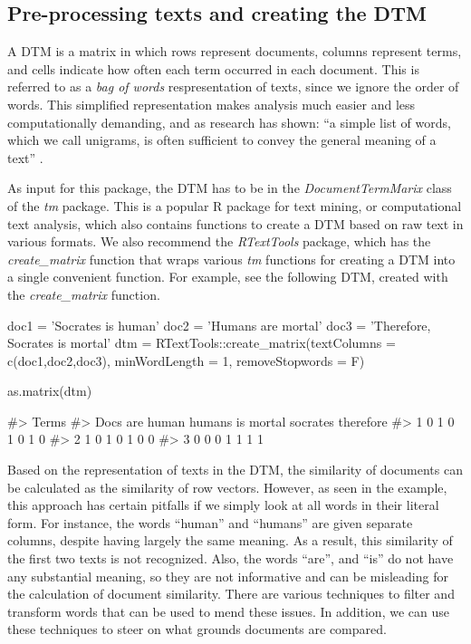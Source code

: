 \subsection{Pre-processing texts and creating the DTM}

A DTM is a matrix in which rows represent documents, columns represent
terms, and cells indicate how often each term occurred in each document.
This is referred to as a \emph{bag of words} respresentation of texts,
since we ignore the order of words. This simplified representation makes
analysis much easier and less computationally demanding, and as research
has shown: ``a simple list of words, which we call unigrams, is often
sufficient to convey the general meaning of a text''
\citep[6]{grimmer13}.

As input for this package, the DTM has to be in the
\emph{DocumentTermMarix} class of the \emph{tm} package. This is a
popular R package for text mining, or computational text analysis, which
also contains functions to create a DTM based on raw text in various
formats. We also recommend the \emph{RTextTools} package, which has the
\emph{create\_matrix} function that wraps various \emph{tm} functions
for creating a DTM into a single convenient function. For example, see
the following DTM, created with the \emph{create\_matrix} function.

\begin{Schunk}
\begin{Sinput}
doc1 = 'Socrates is human'
doc2 = 'Humans are mortal'
doc3 = 'Therefore, Socrates is mortal'
dtm = RTextTools::create_matrix(textColumns = c(doc1,doc2,doc3), 
                                minWordLength = 1, removeStopwords = F)

as.matrix(dtm)
\end{Sinput}
\begin{Soutput}
#>     Terms
#> Docs are human humans is mortal socrates therefore
#>    1   0     1      0  1      0        1         0
#>    2   1     0      1  0      1        0         0
#>    3   0     0      0  1      1        1         1
\end{Soutput}
\end{Schunk}

Based on the representation of texts in the DTM, the similarity of
documents can be calculated as the similarity of row vectors. However,
as seen in the example, this approach has certain pitfalls if we simply
look at all words in their literal form. For instance, the words
``human'' and ``humans'' are given separate columns, despite having
largely the same meaning. As a result, this similarity of the first two
texts is not recognized. Also, the words ``are'', and ``is'' do not have
any substantial meaning, so they are not informative and can be
misleading for the calculation of document similarity. There are various
techniques to filter and transform words that can be used to mend these
issues. In addition, we can use these techniques to steer on what
grounds documents are compared.

